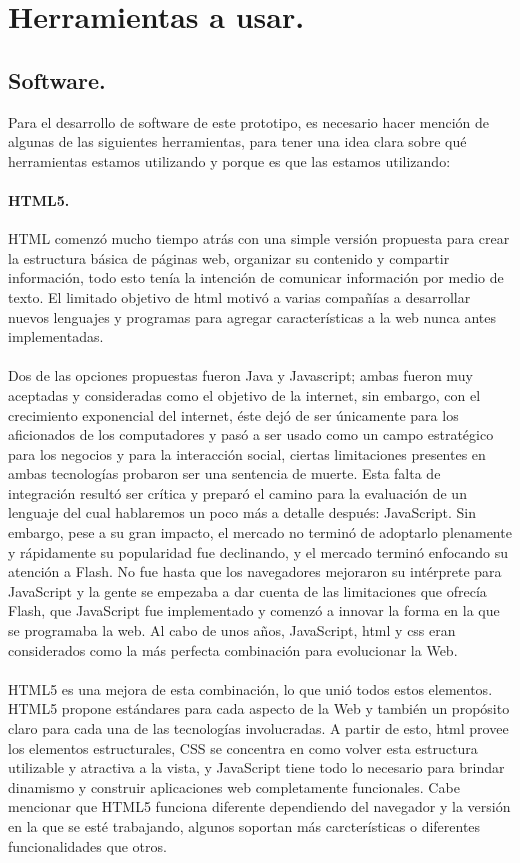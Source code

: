 \documentclass[12pt, a4paper, titlepage]{report}
\begin{document}
    	\section{Herramientas a usar.}
			\subsection{Software.}
			Para el desarrollo de software de este prototipo, es necesario hacer mención de algunas de las siguientes herramientas, para tener una idea clara sobre qué herramientas estamos utilizando y porque es que las estamos utilizando:
			
			\paragraph{HTML5.}
			HTML comenzó mucho tiempo atrás con una simple versión propuesta para crear la estructura básica de páginas web, organizar su contenido y compartir información, todo esto tenía la intención de comunicar información por medio de texto. El limitado objetivo de html motivó a varias compañías a desarrollar nuevos lenguajes y programas para agregar características a la web nunca antes implementadas.   \\\\
			Dos de las opciones propuestas fueron Java y Javascript; ambas fueron muy aceptadas y consideradas como el objetivo de la internet, sin embargo, con el crecimiento exponencial del internet, éste dejó de ser únicamente para los aficionados de los computadores y pasó a ser usado como un campo estratégico para los negocios y para la interacción social, ciertas limitaciones presentes en ambas tecnologías probaron ser una sentencia de muerte. Esta falta de integración resultó ser crítica y preparó el camino para la evaluación de un lenguaje del cual hablaremos un poco más a detalle después: JavaScript. Sin embargo, pese a su gran impacto, el mercado no terminó de adoptarlo plenamente y rápidamente su popularidad fue declinando, y el mercado terminó enfocando su atención a Flash. No fue hasta que los navegadores mejoraron su intérprete para JavaScript y la gente se empezaba a dar cuenta de las limitaciones que ofrecía Flash, que JavaScript fue implementado y comenzó a innovar la forma en la que se programaba la web. Al cabo de unos años, JavaScript, html y css eran considerados como la más perfecta combinación para evolucionar la Web. \\\\
			HTML5 es una mejora de esta combinación, lo que unió todos estos elementos. HTML5 propone estándares para cada aspecto de la Web y también un propósito claro para cada una de las tecnologías involucradas. A partir de esto, html provee los elementos estructurales, CSS se concentra en como volver esta estructura utilizable y atractiva a la vista, y JavaScript tiene todo lo necesario para brindar dinamismo y construir aplicaciones web completamente funcionales. Cabe mencionar que HTML5 funciona diferente dependiendo del navegador y la versión en la que se esté trabajando, algunos soportan más carcterísticas o diferentes funcionalidades que otros.
			
\end{document}
